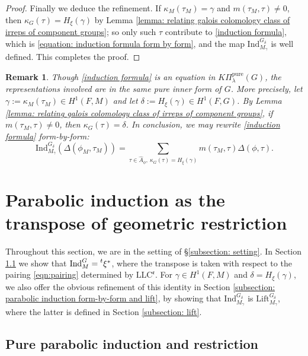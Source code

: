 \documentclass[11pt,letterpaper]{amsart}
\newcommand{\irrepdual}[1]{\widehat{#1}}
\newcommand{\pure}{\mathrm{pure}}
\newcommand{\Ind}{\mathrm{Ind}}
\newcommand{\LLC}{\mathrm{LLC}}
\newcommand{\Lift}{\mathrm{Lift}}
\newtheorem{remark}[thm]{Remark}
\renewcommand{\1}{\mathbbm{1}}
\numberwithin{equation}{section}
\begin{document}
{\begin{proof}
{Finally we deduce the refinement. If $\kappa_M(\tau_M)=\gamma$ and $m(\tau_M,\tau)\neq 0$, then $\kappa_G(\tau)=H_\xi(\gamma)$ by Lemma \ref{lemma: relating galois colomology class of irreps of component groups}; so only such $\tau$ contribute to \eqref{induction formula}, which is \eqref{equation: induction formula form by form}, and the map $\Ind_{M_\gamma}^{G_\delta}$ is well defined. This completes the proof.}
\end{proof}


\begin{remark}
Though \eqref{induction formula} is an equation in $K\Pi_{\lambda}^{\pure}(G)$, the representations involved are in the same pure inner form of $G$. More precisely, let $\gamma:= \kappa_M(\tau_M)\in H^1(F,M)$ and let $\delta:= H_{\xi}(\gamma) \in H^1(F,G)$. By Lemma \ref{lemma: relating galois colomology class of irreps of component groups}, if $m(\tau_M, \tau) \neq 0$, then $\kappa_G(\tau)= \delta$. In conclusion, we may rewrite \eqref{induction formula} form-by-form:
    \begin{equation}\label{equation: induction formula form by form}
        \Ind_{M_\gamma}^{G_\delta}(\Delta(\phi_M,\tau_M))=\sum_{\tau \in \irrepdual{A}_\phi,~\kappa_G(\tau)=H_\xi(\gamma)}{m(\tau_M, \tau)} \Delta(\phi, \tau).
    \end{equation}
\end{remark}


\section{Parabolic induction as the transpose of geometric restriction}
Throughout this section, we are in the setting of \S \ref{subsection: setting}. In Section \ref{subsection: pure parabolic induction and restriction}  we show that $\Ind_M^G=\prescript{t}{}{\xi^*}$, where the transpose is taken with respect to the pairing \eqref{eqn:pairing} determined by $\LLC^{\mathfrak{e}}$. For $\gamma\in H^1(F,M)$ and $\delta=H_\xi(\gamma)$, we also offer the obvious refinement of this identity in Section \ref{subsection: parabolic induction form-by-form and lift}, by showing that $\Ind_{M_\gamma}^{G_\delta}$ is $\Lift_{M_\gamma}^{G_\delta}$, where the latter is defined in Section \ref{subsection: lift}.

\subsection{Pure parabolic induction and restriction}\label{subsection: pure parabolic induction and restriction}

}
\end{document}
